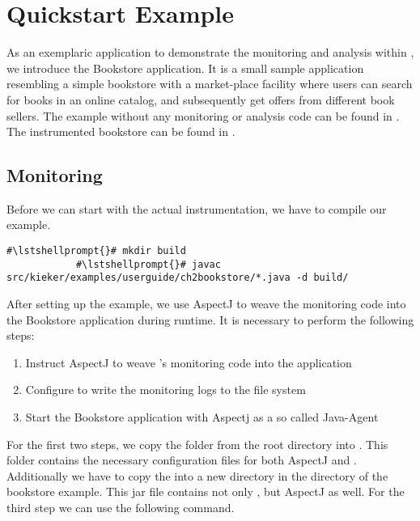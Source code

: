 \chapter{Quickstart Example}\label{chp:Quickstart-Example}

	As an exemplaric application to demonstrate the monitoring and analysis within \Kieker{}, we introduce the Bookstore application. It is a small sample application resembling a simple bookstore with a market-place facility where users can search for books in an online catalog, and subsequently get offers from different book sellers. The example without any monitoring or analysis code can be found in \dir{\plainBookstoreApplicationDirDistro}. The instrumented bookstore can be found in \dir{\quickstartBookstoreApplicationDirDistro}.

	\section{Monitoring}
	
		Before we can start with the actual instrumentation, we have to compile our example.
		\setBashListing
		\begin{lstlisting}[gobble=6,caption=Commands to compile the Bookstore]
			#\lstshellprompt{}# mkdir build
			#\lstshellprompt{}# javac src/kieker/examples/userguide/ch2bookstore/*.java -d build/
		\end{lstlisting} 

		\noindent
		After setting up the example, we use AspectJ \cite{AspectJ-WebSite} to weave the \Kieker{} monitoring code into the Bookstore application during runtime. It is necessary to perform the following steps:
		\begin{enumerate}
			\setlength{\itemsep}{-2pt}
			\item Instruct AspectJ to weave \Kieker{}'s monitoring code into the application
			\item Configure \Kieker{} to write the monitoring logs to the file system
			\item Start the Bookstore application with Aspectj as a so called Java-Agent 
		\end{enumerate}
	
		\noindent
		For the first two steps, we copy the  folder from the root directory into \dir{\plainBookstoreApplicationDirDistro}. This folder contains the necessary configuration files for both AspectJ and \Kieker{}. Additionally we have to copy the  into a new  directory in the directory of the bookstore example. This jar file contains not only \Kieker{}, but AspectJ as well. For the third step we can use the following command.
		
